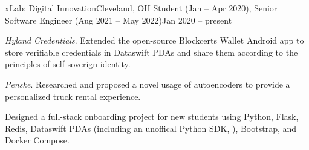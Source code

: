 \begin{ritemize}
{xLab: Digital Innovation}{Cleveland, OH}
{Student (Jan -- Apr 2020), Senior Software Engineer (Aug 2021 -- May 2022)}{Jan 2020 -- present}
	\item \emph{Hyland Credentials}. Extended the open-source Blockcerts Wallet Android app to store verifiable credentials in Dataswift PDAs and share them according to the principles of self-soverign identity.
	\item \emph{Penske}. Researched and proposed a novel usage of autoencoders to provide a personalized truck rental experience.
	\item Designed a full-stack onboarding project for new students using Python, Flask, Redis, Dataswift PDAs (including an unoffical Python SDK, ), Bootstrap, and Docker Compose.
\end{ritemize}